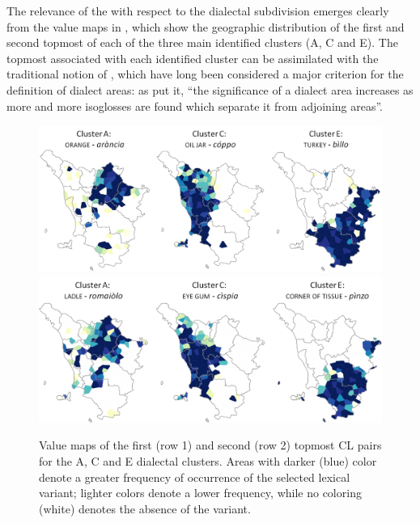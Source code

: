 \documentclass[output=paper]{LSP/langsci}
\begin{document}
 
The relevance of the  with respect to the dialectal subdivision emerges clearly from the value maps in , which show the geographic distribution of the first and second topmost  of each of the three main identified clusters (A, C and E). The topmost  associated with each identified cluster can be assimilated with the traditional notion of , which have long been considered a major criterion for the definition of dialect areas: as \citet{chambers_dialectology_1998} put it, “the significance of a dialect area increases as more and more isoglosses are found which separate it from adjoining areas”.



\begin{figure}[t]
\includegraphics[width=\textwidth]{illustrations/monte_wiel_fig21}\\
\includegraphics[width=\textwidth]{illustrations/monte_wiel_fig22} 
\caption{Value maps of the first (row 1) and second (row 2) topmost CL pairs for the A, C and E dialectal clusters. Areas with darker (blue) color denote a greater frequency of occurrence of the selected lexical variant; lighter colors denote a lower frequency, while no coloring (white) denotes the absence of the variant.}
\label{fig:monte:2}
\end{figure}
\end{document}
